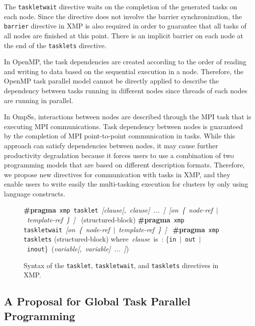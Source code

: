 ﻿\documentclass[graybox]{svmult}
\begin{document}
The {\tt taskletwait} directive waits on the completion of the generated tasks on each node. Since the directive does not involve the barrier synchronization, the {\tt barrier} directive in XMP is also required in order to guarantee that all tasks of all nodes are finished at this point. There is an implicit barrier on each node at the end of the {\tt tasklets} directive.

In OpenMP, the task dependencies are created according to the order of reading and writing to data based on the sequential execution in a node.
Therefore, the OpenMP task parallel model cannot be directly applied to describe the dependency between tasks running in different nodes since threads of each nodes are running in parallel.

In OmpSs\cite{OMPSS}, interactions between nodes are described through the MPI task that is executing MPI communications. Task dependency between nodes is guaranteed by the completion of MPI point-to-point communication in tasks. While this approach can satisfy dependencies between nodes, it may cause further productivity degradation because it forces users to use a combination of two programming models that are based on different description formats. Therefore, we propose new directives for communication with tasks in XMP, and they enable users to write easily the multi-tasking execution for clusters by only using language constructs.

\begin{figure}[t]
\begin{center}
\vbox{\scriptsize
\hbox{{\bf \#pragma} {\tt xmp tasklet} {\it [clause[, clause] ... ]} {\it [on \{ node-ref $|$ template-ref \} ] }}
\hbox{\quad (structured-block)}
\hbox{}
\hbox{{\bf \#pragma} {\tt xmp taskletwait} {\it [on \{ node-ref $|$ template-ref \} ] }}
\hbox{}
\hbox{{\bf \#pragma} {\tt xmp tasklets}}
\hbox{\quad (structured-block)}
\hbox{}
\hbox{\quad where {\it clause} is :}
\hbox{\qquad \{{\tt in} $|$ {\tt out} $|$ {\tt inout}\} ({\it variable[, variable] ... ]})}
}
\centerline{}
  \caption{Syntax of the {\tt tasklet}, {\tt taskletwait}, and {\tt tasklets} directives in XMP.}
  \label{FIG_TASKLET}
\end{center}
\end{figure}

\subsection{A Proposal for Global Task Parallel Programming}
\end{document}
